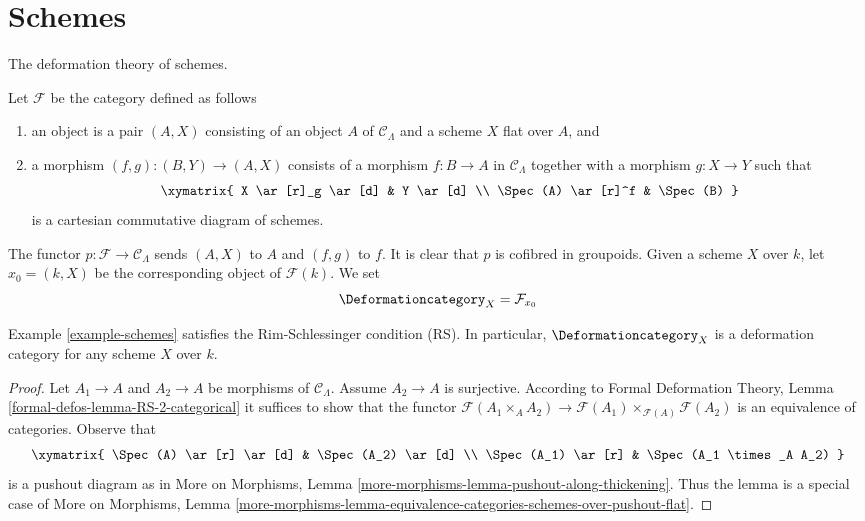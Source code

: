 \section{Schemes}
\label{section-schemes}

\noindent
The deformation theory of schemes.

\begin{example}[Schemes]
\label{example-schemes}
Let $\mathcal{F}$ be the category defined as follows
\begin{enumerate}
\item an object is a pair $(A, X)$ consisting of an
object $A$ of $\mathcal{C}_\Lambda$ and a scheme $X$ flat over $A$, and
\item a morphism $(f, g) : (B, Y) \to (A, X)$ consists of
a morphism $f : B \to A$ in $\mathcal{C}_\Lambda$ together
with a morphism $g : X \to Y$ such that
$$
\xymatrix{
X \ar[r]_g \ar[d] & Y \ar[d] \\
\Spec(A) \ar[r]^f & \Spec(B)
}
$$
is a cartesian commutative diagram of schemes.
\end{enumerate}
The functor $p : \mathcal{F} \to \mathcal{C}_\Lambda$ sends $(A, X)$
to $A$ and $(f, g)$ to $f$. It is clear that $p$ is cofibred in groupoids.
Given a scheme $X$ over $k$, let $x_0 = (k, X)$ be the corresponding object
of $\mathcal{F}(k)$. We set
$$
\Deformationcategory_X = \mathcal{F}_{x_0}
$$
\end{example}

\begin{lemma}
\label{lemma-schemes-RS}
Example \ref{example-schemes}
satisfies the Rim-Schlessinger condition (RS).
In particular, $\Deformationcategory_X$ is a deformation category
for any scheme $X$ over $k$.
\end{lemma}

\begin{proof}
Let $A_1 \to A$ and $A_2 \to A$ be morphisms of $\mathcal{C}_\Lambda$.
Assume $A_2 \to A$ is surjective. According to
Formal Deformation Theory, Lemma
\ref{formal-defos-lemma-RS-2-categorical}
it suffices to show that the functor
$\mathcal{F}(A_1 \times_A A_2) \to
\mathcal{F}(A_1) \times_{\mathcal{F}(A)} \mathcal{F}(A_2)$
is an equivalence of categories.
Observe that
$$
\xymatrix{
\Spec(A) \ar[r] \ar[d] & \Spec(A_2) \ar[d] \\
\Spec(A_1) \ar[r] &
\Spec(A_1 \times_A A_2)
}
$$
is a pushout diagram as in More on Morphisms, Lemma
\ref{more-morphisms-lemma-pushout-along-thickening}.
Thus the lemma is a special case of More on Morphisms, Lemma
\ref{more-morphisms-lemma-equivalence-categories-schemes-over-pushout-flat}.
\end{proof}


